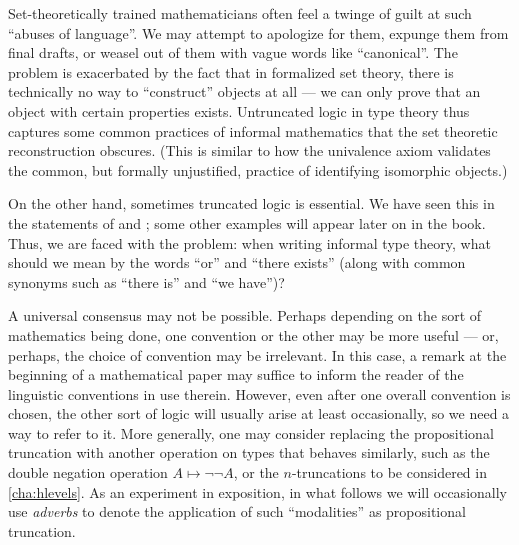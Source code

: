 Set-theoretically trained mathematicians often feel a twinge of guilt at such ``abuses of language''.
We may attempt to apologize for them, expunge them from final drafts, or weasel out of them with vague words like ``canonical''.
The problem is exacerbated by the fact that in formalized set theory, there is technically no way to ``construct'' objects at all --- we can only prove that an object with certain properties exists.
Untruncated logic in type theory thus captures some common practices of informal mathematics that the set theoretic reconstruction obscures.
(This is similar to how the univalence axiom validates the common, but formally unjustified, practice of identifying isomorphic objects.)

On the other hand, sometimes truncated logic is essential.
We have seen this in the statements of \LEM{} and \choice{}; some other examples will appear later on in the book.
Thus, we are faced with the problem: when writing informal type theory, what should we mean by the words ``or'' and ``there exists'' (along with common synonyms such as ``there is'' and ``we have'')?

A universal consensus may not be possible.
Perhaps depending on the sort of mathematics being done, one convention or the other may be more useful --- or, perhaps, the choice of convention may be irrelevant.
In this case, a remark at the beginning of a mathematical paper may suffice to inform the reader of the linguistic conventions in use therein.
However, even after one overall convention is chosen, the other sort of logic will usually arise at least occasionally, so we need a way to refer to it.
More generally, one may consider replacing the propositional truncation with another operation on types that behaves similarly, such as the double negation operation $A\mapsto \neg\neg A$, or the $n$-truncations to be considered in \cref{cha:hlevels}.
As an experiment in exposition,  in what follows we will occasionally use \emph{adverbs} to denote the application of such ``modalities'' as propositional truncation.

